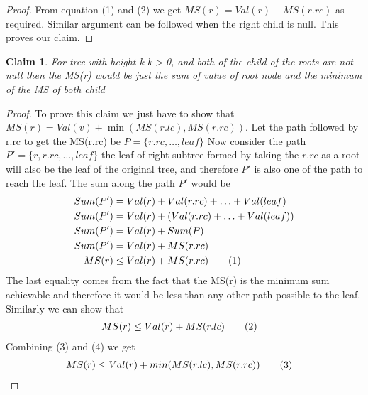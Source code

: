 \documentclass[answers]{exam}
\newcommand\numberthis{\addtocounter{equation}{1}\tag{\theequation}}
\newtheorem{claim}{Claim}
\begin{document}
\begin{questions}
\begin{solution}
\begin{proof}
From equation (1) and (2) we get $MS(r)= Val(r)+MS(r.rc)$ as required. Similar argument can be followed when the right child is null.
\newline This proves our claim.
\end{proof}
\begin{claim}
For tree with height k $k>$0, and both of the child of the roots are not null then the MS(r) would be just the sum of value of root node and the minimum of the MS of both child
\end{claim}
\begin{proof}
To prove this claim we just have to show that $MS(r)=Val(v)+\min(MS(r.lc),MS(r.rc))$.
\newline Let the path followed by r.rc to get the MS(r.rc) be $P=\{r.rc,\ldots,leaf\}$ Now consider the path $P'=\{r,r.rc,\ldots,leaf\}$ the leaf of right subtree formed by taking the $r.rc$ as a root will also be the leaf of the original tree, and therefore $P'$ is also one of the path to reach the leaf. The sum along the path $P'$ would be 
\begin{align*}
    Sum(P')&=Val(r)+Val(r.rc)+\ldots+Val(leaf)\\
    Sum(P')&=Val(r)+(Val(r.rc)+\ldots+Val(leaf))\\
    Sum(P')&=Val(r)+Sum(P)\\
    Sum(P')&=Val(r)+MS(r.rc) \\
    MS(r)&\leq Val(r)+MS(r.rc) \numberthis \label{eqn}
\end{align*}
The last equality comes from the fact that the MS(r) is the minimum sum achievable and therefore it would be less than any other path possible to the leaf.
Similarly we can show that 
\begin{align*}
    MS(r)&\leq Val(r)+MS(r.lc) \numberthis \label{eqn}
\end{align*}
Combining (3) and (4) we get 
\begin{align*}
    MS(r)&\leq Val(r)+min(MS(r.lc),MS(r.rc)) \numberthis \label{eqn}
\end{align*}


\end{proof}
\end{solution}
\end{questions}
\end{document}
